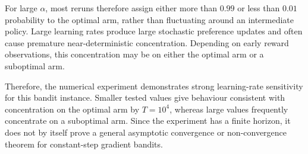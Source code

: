 For large $\alpha$, most reruns therefore assign either more than $0.99$ or
less than $0.01$ probability to the optimal arm, rather than fluctuating
around an intermediate policy. Large learning rates produce large
stochastic preference updates and often cause premature near-deterministic
concentration. Depending on early reward observations, this concentration
may be on either the optimal arm or a suboptimal arm.

Therefore, the numerical experiment demonstrates strong learning-rate
sensitivity for this bandit instance. Smaller tested values give behaviour
consistent with concentration on the optimal arm by $T=10^4$, whereas large
values frequently concentrate on a suboptimal arm. Since the experiment has
a finite horizon, it does not by itself prove a general asymptotic
convergence or non-convergence theorem for constant-step gradient bandits.
